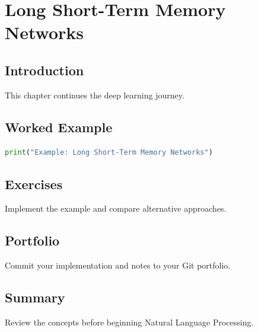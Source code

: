 \chapter{Long Short-Term Memory Networks}
\label{chap:vol7-11}



\section{Introduction}
This chapter continues the deep learning journey.

\section{Worked Example}
\begin{lstlisting}[language=Python]
print("Example: Long Short-Term Memory Networks")
\end{lstlisting}

\section{Exercises}
\begin{exercise}
Implement the example and compare alternative approaches.
\end{exercise}

\section{Portfolio}
Commit your implementation and notes to your Git portfolio.

\section{Summary}
Review the concepts before beginning Natural Language Processing.
